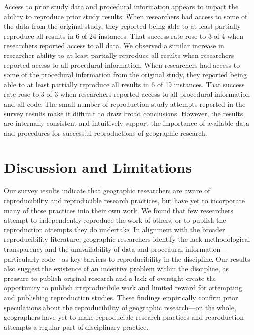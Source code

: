 \documentclass[]{interact}
\theoremstyle{plain}%
\theoremstyle{definition}
\theoremstyle{remark}
\begin{document}
Access to prior study data and procedural information appears to impact the ability to reproduce prior study results. 
When researchers had access to some of the data from the original study, they reported being able to at least partially reproduce all results in 6 of 24 instances. 
That success rate rose to 3 of 4 when researchers reported access to all data. 
We observed a similar increase in researcher ability to at least partially reproduce all results when researchers reported access to all procedural information. 
When researchers had access to some of the procedural information from the original study, they reported being able to at least partially reproduce all results in 6 of 19 instances.
That success rate rose to 3 of 3 when researchers reported access to all procedural information and all code.
The small number of reproduction study attempts reported in the survey results make it difficult to draw broad conclusions.
However, the results are internally consistent and intuitively support the importance of available data and procedures for successful reproductions of geographic research.


\section*{Discussion and Limitations}
Our survey results indicate that geographic researchers are aware of reproducibility and reproducible research practices, but have yet to incorporate many of those practices into their own work. 
We found that few researchers attempt to independently reproduce the work of others, or to publish the reproduction attempts they do undertake.
In alignment with the broader reproducibility literature, geographic researchers identify the lack methodological transparency and the unavailability of data and procedural information---particularly code---as key barriers to reproducibility in the discipline. 
Our results also suggest the existence of an incentive problem within the discipline, as pressure to publish original research and a lack of oversight create the opportunity to publish irreproducibile work and limited reward for attempting and publishing reproduction studies.  
These findings empirically confirm prior speculations about the reproducibility of geographic research---on the whole, geographers have yet to make reproducible research practices and reproduction attempts a regular part of disciplinary practice. 
\end{document}
